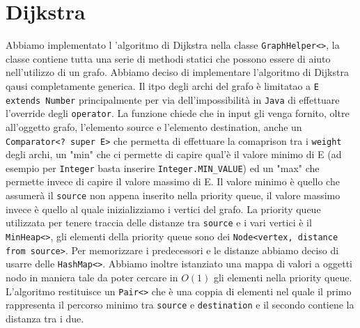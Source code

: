 \documentclass[letterpaper]{report}
\begin{document}
\section{Dijkstra}
Abbiamo implementato l 'algoritmo di Dijkstra nella classe \verb|GraphHelper<>|, 
la classe contiene tutta una serie di methodi statici che possono essere di aiuto 
nell'utilizzo di un grafo. \newline
Abbiamo deciso di implementare l'algoritmo di Dijkstra qausi completamente generica.
Il itpo degli archi del grafo è limitatao a \verb|E extends Number| principalmente 
per via dell'impossibilità in \verb|Java| di effettuare l'override degli \verb|operator|.
\newline
La funzione chiede che in input gli venga fornito, oltre all'oggetto grafo, l'elemento 
source e l'elemento destination, anche un \verb|Comparator<? super E>| che 
permetta di effettuare la comaprison tra i \verb|weight| degli archi, un "min" che ci 
permette di capire qual'è il valore minimo di E (ad esempio per \verb|Integer| basta inserire 
\verb|Integer.MIN_VALUE|) ed un "max" che permette invece di capire il valore massimo di
E. Il valore minimo è quello che assumerà il \verb|source| non appena inserito nella
priority queue, il valore massimo invece è quello al quale inizializziamo i vertici
del grafo. \newline
La priority queue utilizzata per tenere traccia delle distanze tra \verb|source| e
i vari vertici è il \verb|MinHeap<>|, gli elementi della priority queue sono dei\newline 
\verb|Node<vertex, distance from source>|.
Per memorizzare i predecessori e le distanze abbiamo deciso di usarre delle 
\verb|HashMap<>|. \newline
Abbiamo inoltre istanziato una mappa di valori a oggetti nodo in maniera tale da 
poter cercare in $O(1)$ gli elementi nella priority queue. \newline
L'algoritmo restituisce un \verb|Pair<>| che è una coppia di elementi nel quale il
primo rappresenta il percorso minimo tra \verb|source| e \verb|destination| e il 
secondo contiene la distanza tra i due.
\end{document}

